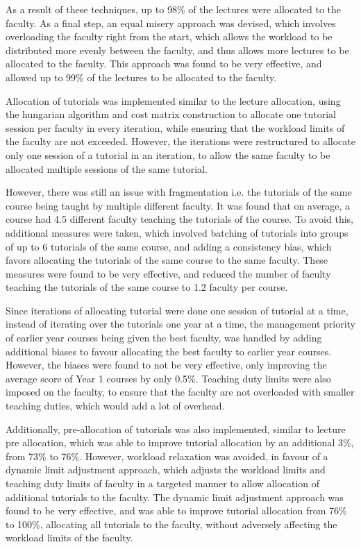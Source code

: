 As a result of these techniques, up to 98\% of the lectures were allocated to the faculty. As a final step, an equal misery approach was devised, which involves overloading the faculty right from the start, which allows the workload to be distributed more evenly between the faculty, and thus allows more lectures to be allocated to the faculty. This approach was found to be very effective, and allowed up to 99\% of the lectures to be allocated to the faculty.

Allocation of tutorials was implemented similar to the lecture allocation, using the hungarian algorithm and cost matrix construction to allocate one tutorial session per faculty in every iteration, while ensuring that the workload limits of the faculty are not exceeded.  However, the iterations were restructured to allocate only one session of a tutorial in an iteration, to allow the same faculty to be allocated multiple sessions of the same tutorial.

However, there was still an issue with fragmentation i.e. the tutorials of the same course being taught by multiple different faculty. It was found that on average, a course had 4.5 different faculty teaching the tutorials of the course. To avoid this, additional measures were taken, which involved batching of tutorials into groups of up to 6 tutorials of the same course, and adding a consistency bias, which favors allocating the tutorials of the same course to the same faculty. These measures were found to be very effective, and reduced the number of faculty teaching the tutorials of the same course to 1.2 faculty per course.

Since iterations of allocating tutorial were done one session of tutorial at a time, instead of iterating over the tutorials one year at a time, the management priority of earlier year courses being given the best faculty, was handled by adding additional biases to favour allocating the best faculty to earlier year courses. However, the biases were found to not be very effective, only improving the average score of Year 1 courses by only 0.5\%. Teaching duty limits were also imposed on the faculty, to ensure that the faculty are not overloaded with smaller teaching duties, which would add a lot of overhead.

Additionally, pre-allocation of tutorials was also implemented, similar to lecture pre allocation, which was able to improve tutorial allocation by an additional 3\%, from 73\% to 76\%. However, workload relaxation was avoided, in favour of a dynamic limit adjustment approach, which adjusts the workload limits and teaching duty limits of faculty in a targeted manner to allow allocation of additional tutorials to the faculty. The dynamic limit adjustment approach was found to be very effective, and was able to improve tutorial allocation from 76\% to 100\%, allocating all tutorials to the faculty, without adversely affecting the workload limits of the faculty.

